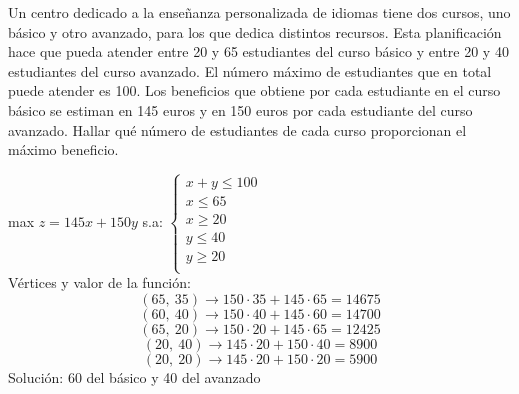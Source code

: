 \documentclass[addpoints,spanish, 12pt,a4paper]{exam}
\begin{document}
\begin{questions}

\question[3] Un centro dedicado a la ense\~nanza personalizada de idiomas tiene dos cursos, uno b\'asico y otro avanzado, para los que dedica distintos recursos. Esta planificaci\'on hace que pueda atender entre 20 y 65 estudiantes del curso b\'asico y entre 20 y 40 estudiantes del curso avanzado. El n\'umero m\'aximo de estudiantes que en total puede atender es 100. 
Los beneficios que obtiene por cada estudiante en el curso b\'asico se estiman en 145 euros y en 150 euros por cada estudiante del curso avanzado. Hallar qu\'e n\'umero de estudiantes de cada curso proporcionan el m\'aximo beneficio. \hfill 
\begin{solution} 
    max $ z=145 x + 150 y$ s.a:
    $\left\{ \begin{matrix}x+y \leq 100  \\ x \leq 65 \\ x \geq 20 \\ y \leq 40 \\ y \geq 20 \\ \end{matrix}\right.$
    \\
    Vértices y valor de la función:
$$\left( 65, \  35\right)\to150 \cdot 35 + 145 \cdot 65=14675$$
$$\left( 60, \  40\right)\to150 \cdot 40 + 145 \cdot 60=14700$$
$$\left( 65, \  20\right)\to150 \cdot 20 + 145 \cdot 65=12425$$
$$\left( 20, \  40\right)\to145 \cdot 20 + 150 \cdot 40=8900$$
$$\left( 20, \  20\right)\to145 \cdot 20 + 150 \cdot 20=5900$$
Solución: 60 del básico y 40 del avanzado
\end{solution}


\end{questions}
\end{document}
